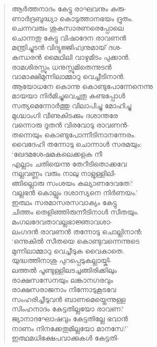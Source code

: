 \begin{verse}
ആര്‍ത്തനാദം കേട്ടു രാഘവനും കരു-\\
ണാര്‍ദ്രബുദ്ധ്യാ കൊടുത്താനഭയം ദ്രുതം.\\
ചെന്നവരും ശുകസാരണരെപ്പോലെ\\
ചൊന്നതു കേട്ടു വിഷാദേന രാവണന്‍\\
മന്ത്രിച്ചുടന്‍ വിദ്യുജ്ജിഹ്വനുമായ് ദശ-\\
കന്ധരന്‍ മൈഥിലി വാഴുമിടം പുക്കാന്‍.\\
രാമശിരസ്സും ധനുസ്സുമിതെന്നുടന്‍\\
വാമാക്ഷിമുന്നിലാമ്മാറു വെച്ചീടിനാന്‍.\\
ആയോധനേ കൊന്നു കൊണ്ടുപോന്നേനെന്നു\\
മായയാ നിര്‍മിച്ചുവെച്ചതു കണ്ടപ്പോള്‍\\
സത്യമെന്നോര്‍ത്തു വിലാപിച്ചു മോഹിച്ചു\\
മുഗ്ദ്ധാംഗി വീണുകിടക്കും ദശാന്തരേ\\
വന്നൊരു ദൂതന്‍ വിരവോടു രാവണന്‍-\\
തന്നെയും കൊണ്ടുപോന്നീടിനാനന്നേരം.\\
വൈദേഹി തന്നോടു ചൊന്നാള്‍ സരമയും:\\
‘ഖേദമശേഷമകലെക്കളക നീ\\
എല്ലാം ചതിയെന്നു തേറീടിതൊക്കവേ\\
നല്ലവണ്ണം വരും നാലു നാളുള്ളിലി-\\
ങ്ങില്ലൊരു സംശയം കല്യാണദേവതേ?\\
വല്ലഭന്‍ കൊല്ലും ദശാസ്യനെ നിര്‍ണയം.’\\
ഇത്ഥം സരമാസരസവാക്യം കേട്ടു\\
ചിത്തം തെളിഞ്ഞിരുന്നീടിനാള്‍ സീതയും.\\
മംഗലദേവതാവല്ലഭാജ്ഞാവശാ-\\
ലംഗദന്‍ രാവണന്‍ തന്നോടു ചൊല്ലിനാന്‍:\\
‘ഒന്നുകില്‍ സീതയെ കൊണ്ടുവന്നെന്നുടെ\\
മുന്നിലാമ്മാറു വെച്ചീടുക വൈകാതെ.\\
യുദ്ധത്തിനാശു പുറപ്പെടുകല്ലായ്കി-\\
ലത്തല്‍ പൂണ്ടുള്ളിലടച്ചങ്ങിരിക്കിലും\\
രാക്ഷസസേനയും ലങ്കാനഗരവും\\
രാക്ഷസരാജനാം നിന്നോടുകൂടവേ\\
സംഹരിച്ചീടുവന്‍ ബാണമെയ്തെന്നുള്ള\\
സിംഹനാദം കേട്ടതില്ലയോ രാവണ?\\
ജ്യാനാദഘോഷവും കേട്ടതില്ലേ ഭവാന്‍\\
നാണം നിനക്കേതുമില്ലയോ മാനസേ?’\\
ഇത്ഥമധിക്ഷേപവാക്കുകള്‍ കേട്ടതി-\\

\end{verse}
